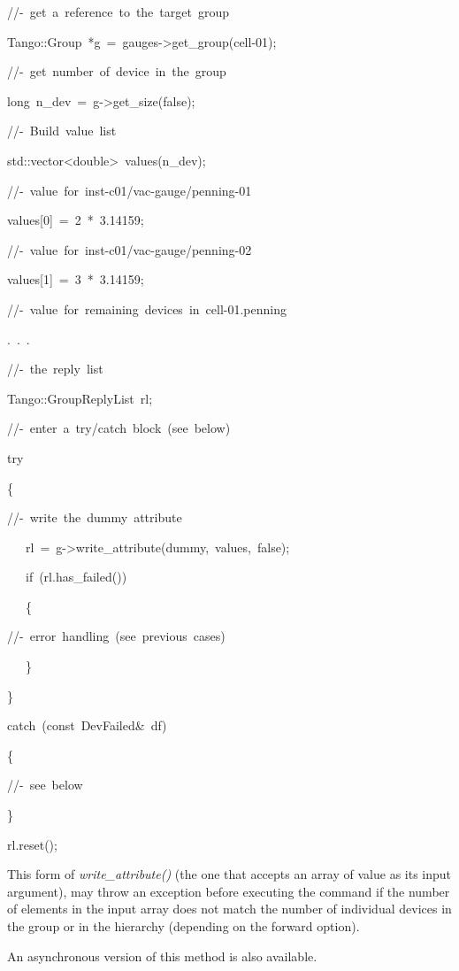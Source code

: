 
\begin{lyxcode}
//-~get~a~reference~to~the~target~group

Tango::Group~{*}g~=~gauges->get\_group(\textquotedbl{}cell-01\textquotedbl{});

//-~get~number~of~device~in~the~group

long~n\_dev~=~g->get\_size(false);

//-~Build~value~list

std::vector<double>~values(n\_dev);

//-~value~for~inst-c01/vac-gauge/penning-01

values{[}0{]}~=~2~{*}~3.14159;

//-~value~for~inst-c01/vac-gauge/penning-02

values{[}1{]}~=~3~{*}~3.14159;

//-~value~for~remaining~devices~in~cell-01.penning

.~.~.

//-~the~reply~list

Tango::GroupReplyList~rl;

//-~enter~a~try/catch~block~(see~below)

try

\{

//-~write~the~\textquotedbl{}dummy\textquotedbl{}~attribute

~~~rl~=~g->write\_attribute(\textquotedbl{}dummy\textquotedbl{},~values,~false);

~~~if~(rl.has\_failed())

~~~\{

//-~error~handling~(see~previous~cases)

~~~\}

\}

catch~(const~DevFailed\&~df)

\{

//-~see~below

\}

rl.reset();
\end{lyxcode}


This form of \emph{write\_attribute()} (the
one that accepts an array of value as its input argument), may throw
an exception before executing the command if the number of elements
in the input array does not match the number of individual devices
in the group or in the hierarchy (depending on the forward option). 

An asynchronous version of this method is also available.

